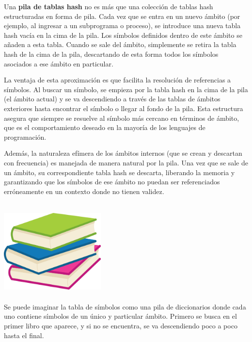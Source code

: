 Una \textbf{pila de tablas hash} no es más que una colección de tablas hash estructuradas en forma de pila. Cada vez que se entra en un nuevo ámbito (por ejemplo, al ingresar a un subprograma o proceso), se introduce una nueva tabla hash vacía en la cima de la pila. Los símbolos definidos dentro de este ámbito se añaden a esta tabla. Cuando se sale del ámbito, simplemente se retira la tabla hash de la cima de la pila, descartando de esta forma todos los símbolos asociados a ese ámbito en particular.

\vspace{0.5cm}

La ventaja de esta aproximación es que facilita la resolución de referencias a símbolos. Al buscar un símbolo, se empieza por la tabla hash en la cima de la pila (el ámbito actual) y se va descendiendo a través de las tablas de ámbitos exteriores hasta encontrar el símbolo o llegar al fondo de la pila. Esta estructura asegura que siempre se resuelve al símbolo más cercano en términos de ámbito, que es el comportamiento deseado en la mayoría de los lenguajes de programación.

\vspace{0.5cm}

Además, la naturaleza efímera de los ámbitos internos (que se crean y descartan con frecuencia) es manejada de manera natural por la pila. Una vez que se sale de un ámbito, su correspondiente tabla hash se descarta, liberando la memoria y garantizando que los símbolos de ese ámbito no puedan ser referenciados erróneamente en un contexto donde no tienen validez.

{
\centering
\includegraphics[width=200px, height=200px]{images/implementacion/semantic/scope_stack.png}\\
}
\vspace{0.2cm}
Se puede imaginar la tabla de símbolos como una pila de diccionarios donde cada uno contiene símbolos de un único y particular ámbito. Primero se busca en el primer libro que aparece, y si no se encuentra, se va descendiendo poco a poco hasta el final.

